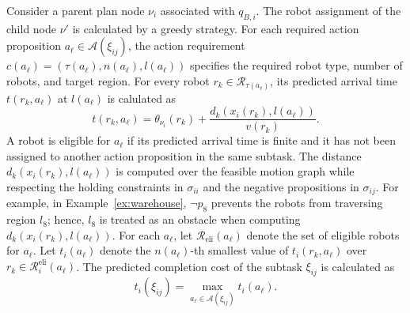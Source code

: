 \documentclass[lettersize,journal]{IEEEtran}
\theoremstyle{italiclemma}
\theoremstyle{italiclemma}
\theoremstyle{definition}
\begin{document}
Consider a parent plan node $\nu_i$ associated with $q_{B,i}$. The robot assignment of the child node $\nu'$ is calculated by a greedy strategy. For each required action proposition $a_\ell\in\mathcal A(\xi_{ij})$, the action requirement
$c(a_\ell)=(\tau(a_\ell),n(a_\ell),l(a_\ell))$ specifies the required robot type, number of robots, and target region. For every robot $r_k\in\mathcal R_{\tau(a_\ell)}$, its predicted arrival time $t(r_k,a_\ell)$ at $l(a_\ell)$ is calulated as
\begin{equation}
t(r_k,a_\ell) = \theta_{\nu_i}(r_k) + \frac{d_k(x_i(r_k),l(a_\ell))}{v(r_k)}.
\label{eq:predicted_arrival}
\end{equation} 
A robot is eligible for $a_\ell$ if its predicted arrival time is finite and it has not been assigned to another action proposition in the same subtask. The distance $d_k(x_{i}(r_k),l(a_\ell))$ is computed over the
feasible motion graph while respecting the holding constraints in $\sigma_{ii}$ and the negative propositions in $\sigma_{ij}$. For example, in Example~\ref{ex:warehouse},  $\neg p_8$ prevents the robots from traversing region $l_8$; hence, $l_8$ is treated as an obstacle when computing $d_k(x_{i}(r_k),l(a_\ell))$.
For each $a_\ell$, let $\mathcal R_{\mathrm{eli}}(a_\ell)$ denote the set of eligible robots for $a_\ell$. Let $t_i(a_\ell)$ denote the $n(a_\ell)$-th smallest value of $t_i(r_k,a_\ell)$ over $r_k\in\mathcal R_i^{\mathrm{eli}}(a_\ell)$. The predicted completion cost of the subtask $\xi_{ij}$ is calculated as
\begin{equation}
t_i(\xi_{ij})
=
\max_{a_\ell\in\mathcal A(\xi_{ij})}
t_i(a_\ell).
\label{eq:subtask_completion_time}
\end{equation}
\end{document}
